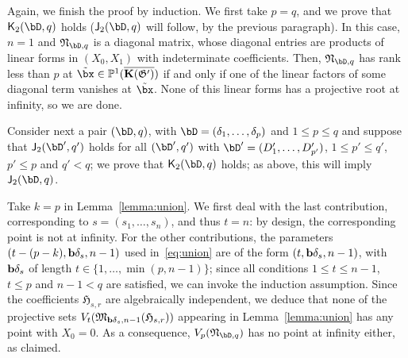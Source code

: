 \documentclass[12pt]{article}
\begin{document}
Again, we finish the proof by induction. We first take $p=q$, and we
prove that $\assJ_2(\bD,q)$ holds ($\assI_2(\bD,q)$ will follow,
by the previous paragraph). In this case, $n=1$ and
$\mathfrak{N}_{\bD,q}$ is a diagonal matrix, whose diagonal entries
are products of linear forms in $(X_0,X_1)$ with indeterminate
coefficients. Then, $\mathfrak{N}_{\bD,q}$ has rank less than $p$ at
$\tilde\bx\in\P^1(\KKGpbar)$ if and only if one of the linear factors
of some diagonal term vanishes at $\tilde \bx$. None of this linear
forms has a projective root at infinity, so we are done.

Consider next a pair $(\bD,q)$, with $\bD=(\delta_1,\dots,\delta_p)$ and $1 \le p
\le q$ and suppose that $\assI_2(\bD',q')$ holds for all $(\bD',q')$
with $\bD'=(D'_1,\dots,D'_{p'})$, $1 \le p' \le q'$, $p' \le p$ and $q' <
q$; we prove that $\assJ_2(\bD,q)$ holds; as above, this will imply
 $\assI_2(\bD,q)$.

Take $k=p$ in Lemma~\ref{lemma:union}. We first deal with the last
contribution, corresponding to $s=(s_1,\dots,s_n)$, and thus $t=n$: by
design, the corresponding point is not at infinity. For the other
contributions, the parameters $(t-(p-k),\mathbf{b}\delta_s,n-1)$ used
in~\eqref{eq:union} are of the form $(t,\mathbf{b}\delta_s,n-1)$, with $\mathbf{b}\delta_s$ of
length $t \in \{1,\dots, \min(p,n-1)\}$; since all conditions $ 1 \le
t \le n-1$, $t \le p$ and $n-1 < q$ are satisfied, we can invoke the
induction assumption. Since the coefficients $\mathfrak{H}_{s,r}$ are
algebraically independent, we deduce that none of the
projective sets $V_t(\mathfrak{M}_{\mathbf{b}\delta_s,n-1}(\mathfrak{H}_{s,r}))$
appearing in Lemma~\ref{lemma:union} has any point with $X_0=0$. As a
consequence, $V_p(\mathfrak{N}_{\bD,q})$ has no point at infinity
either, as claimed.
\end{document}
